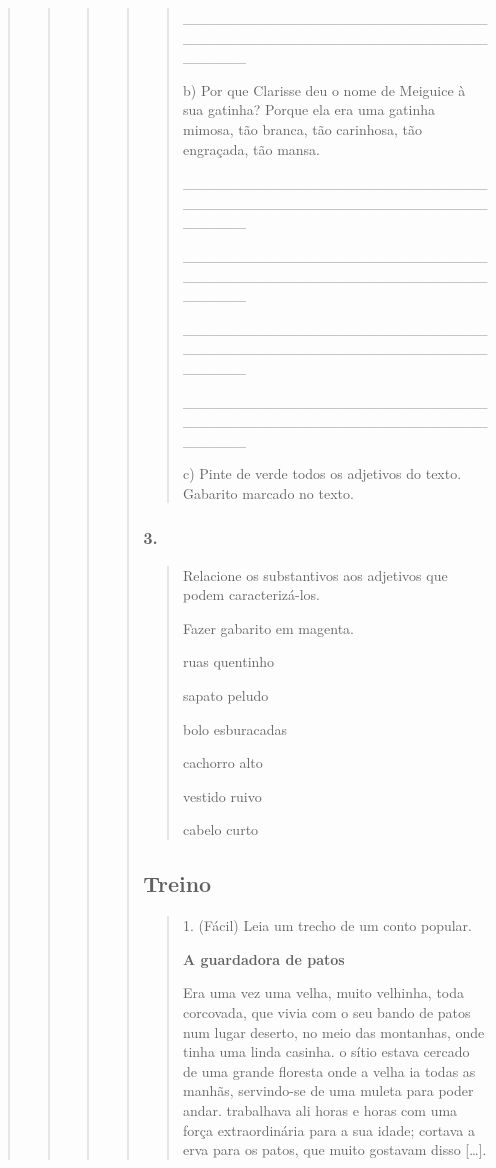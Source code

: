 \begin{quote}
\begin{quote}
\begin{quote}
\begin{quote}
\begin{quote}
\_\_\_\_\_\_\_\_\_\_\_\_\_\_\_\_\_\_\_\_\_\_\_\_\_\_\_\_\_\_\_\_\_\_\_\_\_\_\_\_\_\_\_\_\_\_\_\_\_\_\_\_\_\_\_\_\_\_\_\_\_\_\_\_

b) Por que Clarisse deu o nome de Meiguice à sua gatinha? Porque ela era
uma gatinha mimosa, tão branca, tão carinhosa, tão engraçada, tão mansa.

\_\_\_\_\_\_\_\_\_\_\_\_\_\_\_\_\_\_\_\_\_\_\_\_\_\_\_\_\_\_\_\_\_\_\_\_\_\_\_\_\_\_\_\_\_\_\_\_\_\_\_\_\_\_\_\_\_\_\_\_\_\_\_\_

\_\_\_\_\_\_\_\_\_\_\_\_\_\_\_\_\_\_\_\_\_\_\_\_\_\_\_\_\_\_\_\_\_\_\_\_\_\_\_\_\_\_\_\_\_\_\_\_\_\_\_\_\_\_\_\_\_\_\_\_\_\_\_\_

\_\_\_\_\_\_\_\_\_\_\_\_\_\_\_\_\_\_\_\_\_\_\_\_\_\_\_\_\_\_\_\_\_\_\_\_\_\_\_\_\_\_\_\_\_\_\_\_\_\_\_\_\_\_\_\_\_\_\_\_\_\_\_\_

\_\_\_\_\_\_\_\_\_\_\_\_\_\_\_\_\_\_\_\_\_\_\_\_\_\_\_\_\_\_\_\_\_\_\_\_\_\_\_\_\_\_\_\_\_\_\_\_\_\_\_\_\_\_\_\_\_\_\_\_\_\_\_\_

c) Pinte de verde todos os adjetivos do texto. Gabarito marcado no
texto.
\end{quote}

\subsubsection{3. }\label{section-59}

\begin{quote}
Relacione os substantivos aos adjetivos que podem caracterizá-los.

Fazer gabarito em magenta.

ruas quentinho

sapato peludo

bolo esburacadas

cachorro alto

vestido ruivo

cabelo curto
\end{quote}

\subsection{Treino}\label{treino-6}

\begin{quote}
1. (Fácil) Leia um trecho de um conto popular.

\textbf{A guardadora de patos}

Era uma vez uma velha, muito velhinha, toda corcovada, que vivia com o
seu bando de patos num lugar deserto, no meio das montanhas, onde tinha
uma linda casinha. o sítio estava cercado de uma grande floresta onde a
velha ia todas as manhãs, servindo-se de uma muleta para poder andar.
trabalhava ali horas e horas com uma força extraordinária para a sua
idade; cortava a erva para os patos, que muito gostavam disso
{[}\ldots{}{]}.


\end{quote}
\end{quote}
\end{quote}
\end{quote}
\end{quote}
